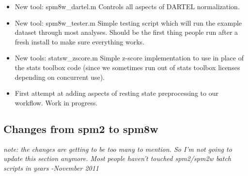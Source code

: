 \documentclass[12pt]{article}
\begin{document}
\begin{itemize}
	\item New tool: spm8w\_dartel.m Controls all aspects of DARTEL normalization.
	\item New tool: spm8w\_tester.m Simple testing script which will run the example dataset \newline through most analyses. Should be the first thing people run after a fresh install to make sure everything works. 
	\item New tools: statsw\_zscore.m Simple z-score implementation to use in place of the stats toolbox code (since we sometimes run out of stats toolbox licenses depending on concurrent use). 
	\item First attempt at adding aspects of resting state preprocessing to our workflow. Work in progress.	
\end{itemize}

\subsection{Changes from spm2 to spm8w}
\textit{note: the changes are getting to be too many to mention. So I'm not going to update this section anymore. Most people haven't touched spm2/spm2w batch scripts in years -November 2011}
\end{document}
